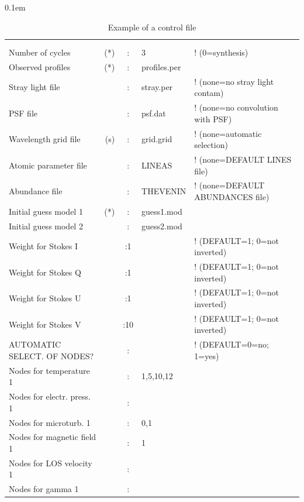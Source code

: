 \begin{table}
\small
\tabcolsep 0.1em
\caption{Example of a control file \protect \\ 
         }
\label{control}
\begin{tabular}{lrcll}
 &  & &            &       \\
 &  & &            &       \\

Number of cycles          &(*)&:&3             &! (0=synthesis)  \\
Observed profiles         &(*)&:&profiles.per &             \\
Stray light file          &   &:&stray.per    & ! (none=no stray light contam)\\
PSF file                  &   &:&psf.dat      & ! (none=no convolution with PSF)\\
Wavelength grid file      &(s)&:&grid.grid     & ! (none=automatic selection)\\
Atomic parameter file      &  &:&LINEAS       & ! (none=DEFAULT LINES file)\\
Abundance file           &   &:&THEVENIN  \phantom{ho}   & ! (none=DEFAULT ABUNDANCES file)\\
Initial guess model 1     &(*)&:&guess1.mod   &\\
Initial guess model 2     &   &:&guess2.mod   &\\
Weight for Stokes I        &  &:1 &            &! (DEFAULT=1; 0=not inverted)\\
Weight for Stokes Q        &  &:1 &            &! (DEFAULT=1; 0=not inverted)\\
Weight for Stokes U        &  &:1 &            &! (DEFAULT=1; 0=not inverted)\\
Weight for Stokes V        &  &:10 &            &! (DEFAULT=1; 0=not inverted)\\
AUTOMATIC SELECT. OF NODES?&  &: &            &! (DEFAULT=0=no; 1=yes)\\
Nodes for temperature 1    &  &:&1,5,10,12       &        \\
Nodes for electr. press. 1 &  &:&             &        \\
Nodes for microturb. 1     &  &:&0,1            &       \\
Nodes for magnetic field 1 &  &:&1		   &\\
Nodes for LOS velocity 1   &  &:&     &         \\
Nodes for gamma 1          &  &:&     &          \\

\end{tabular}
\end{table}
